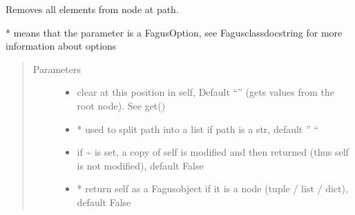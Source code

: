 \documentclass[a4paper,10pt,english]{sphinxmanual}
\begin{document}
\begin{fulllineitems}
\begin{fulllineitems}
\label{\detokenize{fagus.fagus:fagus.fagus.Fagus.clear}}
\pysigstartsignatures
{}
\pysigstopsignatures
\sphinxAtStartPar
Removes all elements from node at path.

\sphinxAtStartPar
* means that the parameter is a FagusOption, see Fagus\sphinxhyphen{}class\sphinxhyphen{}docstring for more information about options
\begin{quote}\begin{description}
\item[{Parameters}] \leavevmode\begin{itemize}
\item {}
\sphinxAtStartPar
{} \textendash{} clear at this position in self, Default “” (gets values from the root node). See get()

\item {}
\sphinxAtStartPar
{} \textendash{} * used to split path into a list if path is a str, default ” “

\item {}
\sphinxAtStartPar
{} \textendash{} if \textasciitilde{} is set, a copy of self is modified and then returned (thus self is not modified), default False

\item {}
\sphinxAtStartPar
{} \textendash{} * return self as a Fagus\sphinxhyphen{}object if it is a node (tuple / list / dict), default False

\end{itemize}


\end{description}
\end{quote}
\end{fulllineitems}
\end{fulllineitems}
\end{document}
